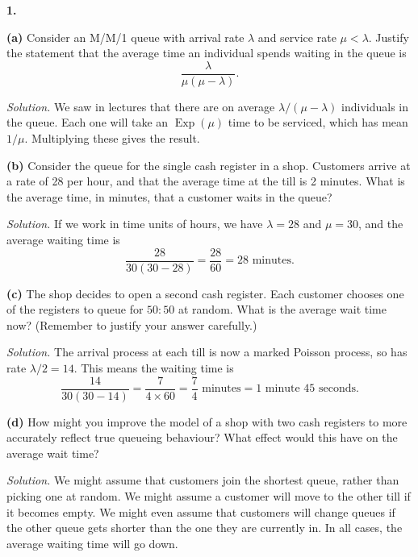 \documentclass[
  a4paper,
]{article}
\theoremstyle{definition}
\theoremstyle{definition}
\theoremstyle{definition}
\theoremstyle{remark}
\begin{document}
\textbf{1.}

\textbf{(a)} Consider an M/M/1 queue with arrival rate \(\lambda\) and service rate \(\mu < \lambda\).
Justify the statement that the average time an individual spends waiting in the queue is
\[ \frac{\lambda}{\mu(\mu - \lambda)} . \]

\begin{myanswers}
\emph{Solution.}
We saw in lectures that there are on average \(\lambda/(\mu-\lambda)\) individuals in the queue. Each one will take an \(\operatorname{Exp}(\mu)\) time to be serviced, which has mean \(1/\mu\). Multiplying these gives the result.

\end{myanswers}

\textbf{(b)} Consider the queue for the single cash register in a shop. Customers arrive at a rate of 28 per hour, and that the average time at the till is 2 minutes. What is the average time, in minutes, that a customer waits in the queue?

\begin{myanswers}
\emph{Solution.}
If we work in time units of hours, we have \(\lambda = 28\) and \(\mu = 30\), and the average waiting time is
\[ \frac{28}{30(30-28)} = \frac{28}{60} = 28 \text{ minutes.}  \]

\end{myanswers}

\textbf{(c)} The shop decides to open a second cash register. Each customer chooses one of the registers to queue for \(50:50\) at random. What is the average wait time now? (Remember to justify your answer carefully.)

\begin{myanswers}
\emph{Solution.}
The arrival process at each till is now a marked Poisson process, so has rate \(\lambda/2 = 14\). This means the waiting time is
\[ \frac{14}{30(30-14)} = \frac{7}{4\times 60} = \frac74 \text{ minutes} = \text{1 minute 45 seconds.}  \]

\end{myanswers}

\textbf{(d)} How might you improve the model of a shop with two cash registers to more accurately reflect true queueing behaviour? What effect would this have on the average wait time?

\begin{myanswers}
\emph{Solution.}
We might assume that customers join the shortest queue, rather than picking one at random. We might assume a customer will move to the other till if it becomes empty. We might even assume that customers will change queues if the other queue gets shorter than the one they are currently in. In all cases, the average waiting time will go down.

\end{myanswers}
\end{document}
